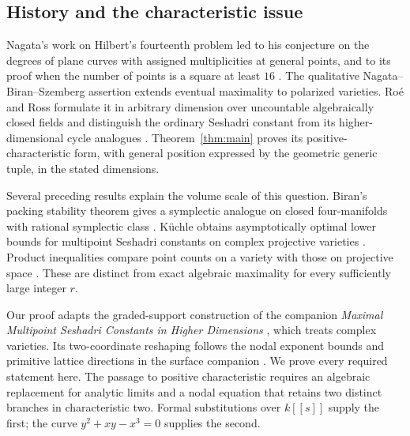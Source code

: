 \subsection{History and the characteristic issue}

Nagata's work on Hilbert's fourteenth problem led to his conjecture on
the degrees of plane curves with assigned multiplicities at general
points, and to its proof when the number of points is a square at least $16$
\cite{Nagata1959}. The qualitative Nagata--Biran--Szemberg assertion
extends eventual maximality to polarized varieties. Ro\'e and Ross
formulate it in arbitrary dimension over uncountable algebraically closed
fields and distinguish the ordinary
Seshadri constant from its higher-dimensional cycle analogues
\cite[Conjecture~1.3 and Remark~1.2]{RoeRoss2009}.
Theorem~\ref{thm:main} proves its positive-characteristic form, with
general position expressed by the geometric generic tuple, in the stated
dimensions.

Several preceding results explain the volume scale of this question.
Biran's packing stability theorem gives a symplectic analogue on
closed four-manifolds with rational symplectic class \cite{Biran1999}.
K\"uchle obtains asymptotically optimal lower bounds for multipoint
Seshadri constants on complex projective varieties \cite{Kuechle1996}.
Product inequalities compare
point counts on a variety with those on projective space
\cite[Theorem~1.1 and Remark~1.2]{RoeRoss2009}.
These are distinct from exact algebraic maximality for every sufficiently
large integer $r$.

Our proof adapts the graded-support construction of the companion
\emph{Maximal Multipoint Seshadri Constants in Higher Dimensions}
\cite[Sections~2--6]{OpenAI2026Higher}, which treats complex varieties.
Its two-coordinate reshaping follows the nodal exponent bounds and
primitive lattice directions in the surface companion
\cite[Propositions~3.2 and~3.4 and Lemma~4.3]{OpenAI2026Surfaces}.
We prove every required statement here. The passage to positive
characteristic requires an algebraic replacement for analytic limits and
a nodal equation that retains two distinct branches in characteristic
two. Formal substitutions over $k[[s]]$ supply the first; the curve
$y^2+xy-x^3=0$ supplies the second.

